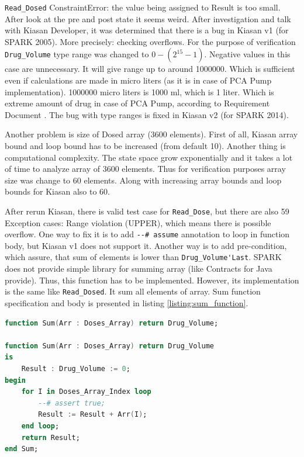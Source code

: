 \lstinline{Read_Dosed} ConstraintError: the value being assigned to Result is too small. After look at the pre and post state it seems weird. After investigation and talk with Kiasan Developer, it was determined that there is a bug in Kiasan v1 (for SPARK 2005). More precisely: checking overflows. For the purpose of verification \lstinline{Drug_Volume} type range was changed to $0 - (2^{15} - 1)$. Negative values in this case are unnecessary. It will give range up to around 1000000. Which is sufficient even if calculations are made in micro liters (as it is in case of PCA Pump implementation). 1000000 micro liters is 1000 ml, which is 1 liter. Which is extreme amount of drug in case of PCA Pump, according to Requirement Document \cite{OpenSourcePCAPump:Paper}. The bug with type ranges is fixed in Kiasan v2 (for SPARK 2014).

Another problem is size of Dosed array (3600 elements). First of all, Kiasan array bound and loop bound has to be increased (from default 10). Another thing is computational complexity. The state space grow exponentially and it takes a lot of time to analyze array of 3600 elements. Thus for verification purposes array size was change to 60 elements. Along with increasing array bounds and loop bounds for Kiasan also to 60.

After rerun Kiasan, there is valid test case for \lstinline{Read_Dose}, but there are also 59 Exception cases: Range violation (UPPER), which means there is possible overflow.
One way to fix it is to add \lstinline{--# assume} annotation to loop in function body, but Kiasan v1 does not support it. Another way is to add pre-condition, which assure, that sum of elements is lower than \lstinline{Drug_Volume'Last}. SPARK does not provide simple library for summing array (like Contracts for Java provide). Thus, this function has to be implemented. However, its implementation is the same like \lstinline{Read_Dosed}. It sum all elements of array. Sum function specification and body is presented in listing \ref{listing:sum_function}.

\singlespacing
\begin{lstlisting}[language=ada, frame=single, gobble=0, caption={Sum function for summing all elements of array}, label={listing:sum_function}]
function Sum(Arr : Doses_Array) return Drug_Volume;

function Sum(Arr : Doses_Array) return Drug_Volume
is
    Result : Drug_Volume := 0;
begin
    for I in Doses_Array_Index loop
        --# assert true;
        Result := Result + Arr(I);
    end loop;
    return Result;
end Sum;
\end{lstlisting}
\doublespacing



